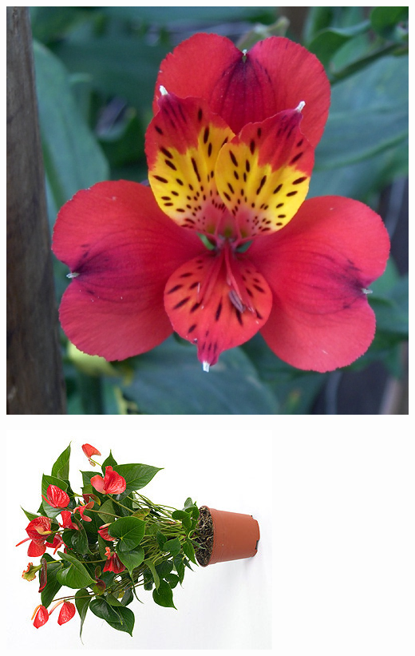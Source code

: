 \documentclass{article}
\begin{document}
\begin{center}
\includegraphics[height=0.925\paperheight]{../Alstroemeria2.jpg}
\end{center}
\newpage

\begin{center}
\includegraphics[height=0.925\paperheight]{../Anthurium.jpg}
\end{center}
\newpage
\end{document}
